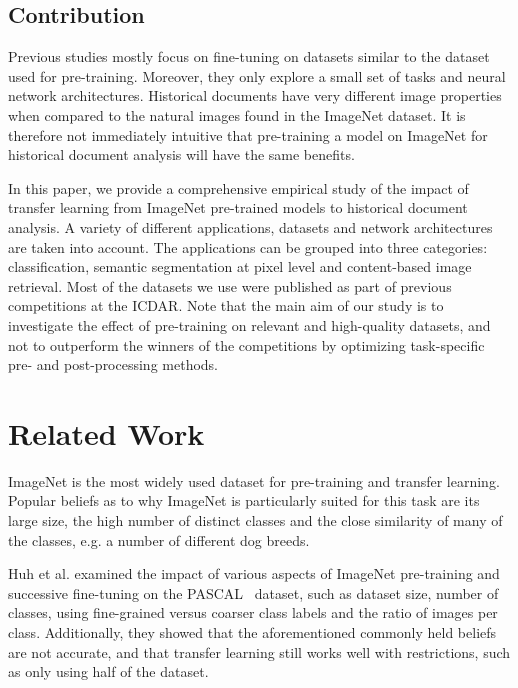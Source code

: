 \documentclass[journal]{IEEEtran}
\newcommand{\af}[1]{{\color{black}#1}}
\newcommand{\ls}[1]{{\color{black}#1}}
\begin{document}
\subsection*{Contribution}
Previous studies mostly focus on fine-tuning on datasets similar to the dataset used for pre-training. Moreover, they only explore a small set of tasks and neural network architectures.
Historical documents have \af{very different image properties when} compared to the natural images found in the ImageNet dataset. It is therefore not immediately intuitive that pre-training a model on ImageNet for historical document analysis will have the same benefits.


\af{In this paper, we provide a comprehensive empirical study of the impact of transfer learning from ImageNet pre-trained models to historical document analysis. A variety of different applications, datasets and network architectures are taken into account.}
The applications can be grouped into three categories: classification, semantic segmentation \ls{at pixel level} \af{and content-based image retrieval.} 
Most of the datasets we use were published as part of previous \af{competitions at the} \ac{ICDAR}.
\af{Note that the main aim of our study is to investigate the effect of pre-training on relevant and high-quality datasets, and not to outperform the winners of the competitions by optimizing task-specific pre- and post-processing methods.} 
 
\section{Related Work}
\label{toc:related_work}

ImageNet is the most widely used dataset for pre-training and transfer learning.
Popular beliefs as to why ImageNet is particularly suited for this task are its large size, the high number of distinct classes and the close similarity of many of the classes, e.g. \ls{a number of} different dog breeds.

Huh et al. \cite{huh2016makes} examined the impact of various aspects \ls{of ImageNet pre-training and successive fine-tuning on the PASCAL~\cite{Everingham15} dataset, such as dataset size, number of classes, using fine-grained versus coarser class labels and the ratio of images per class.} 
Additionally, they showed that the aforementioned commonly held beliefs are not accurate, and that transfer learning still works well with restrictions, such as only using half of the dataset.
\end{document}
